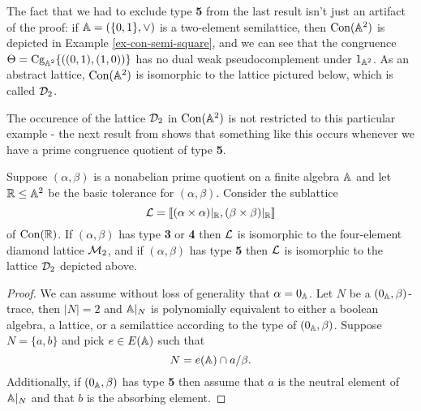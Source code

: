 \begin{appendices}
The fact that we had to exclude type \textbf{5} from the last result isn't just an artifact of the proof: if $\mathbb{A} = (\{0, 1\}, \vee)$ is a two-element semilattice, then $\operatorname{Con}(\mathbb{A}^2)$ is depicted in Example \ref{ex-con-semi-square}, and we can see that the congruence $\Theta = \operatorname{Cg}_{\mathbb{A}^2}\{((0,1), (1,0))\}$ has no dual weak pseudocomplement under $1_{\mathbb{A}^2}$. As an abstract lattice, $\operatorname{Con}(\mathbb{A}^2)$ is isomorphic to the lattice pictured below, which is called $\mathcal{D}_2$.
\begin{center}
\end{center}
The occurence of the lattice $\mathcal{D}_2$ in $\operatorname{Con}(\mathbb{A}^2)$ is not restricted to this particular example - the next result from \cite{hobby-mckenzie} shows that something like this occurs whenever we have a prime congruence quotient of type \textbf{5}.

\begin{prop} Suppose $(\alpha,\beta)$ is a nonabelian prime quotient on a finite algebra $\mathbb{A}$ and let $\mathbb{R} \le \mathbb{A}^2$ be the basic tolerance for $(\alpha, \beta)$. Consider the sublattice
\[
\mathcal{L} = \llbracket (\alpha \times \alpha)|_{\mathbb{R}}, (\beta \times \beta)|_{\mathbb{R}} \rrbracket
\]
of $\operatorname{Con}(\mathbb{R})$. If $(\alpha,\beta)$ has type \textbf{3} or \textbf{4} then $\mathcal{L}$ is isomorphic to the four-element diamond lattice $\mathcal{M}_2$, and if $(\alpha,\beta)$ has type \textbf{5} then $\mathcal{L}$ is isomorphic to the lattice $\mathcal{D}_2$ depicted above.
\end{prop}
\begin{proof} We can assume without loss of generality that $\alpha = 0_{\mathbb{A}}$. Let $N$ be a $(0_{\mathbb{A}}, \beta)$-trace, then $|N| = 2$ and $\mathbb{A}|_N$ is polynomially equivalent to either a boolean algebra, a lattice, or a semilattice according to the type of $(0_{\mathbb{A}},\beta)$. Suppose $N = \{a,b\}$ and pick $e \in E(\mathbb{A})$ such that
\[
N = e(\mathbb{A}) \cap a/\beta.
\]
Additionally, if $(0_{\mathbb{A}}, \beta)$ has type \textbf{5} then assume that $a$ is the neutral element of $\mathbb{A}|_N$ and that $b$ is the absorbing element.


\end{proof}
\end{appendices}
